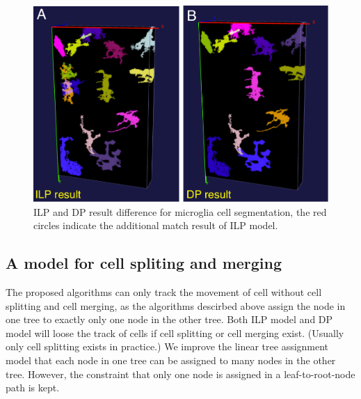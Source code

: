 \begin{figure}[htbp]
\centering
\includegraphics[width=1.0\textwidth]{images/treeassign_threepoint2}
\caption[ILP and DP result difference for microglia cell segmentation]{ILP and DP result difference for microglia cell segmentation, the red circles indicate the additional match result of ILP model.}
\label{fig:treeassign-threepoint2}
\end{figure}

\subsection{A model for cell spliting and merging}
The proposed algorithms can only track the movement of cell without cell splitting and cell merging, as the algorithms descirbed above assign the node in one tree to exactly only one node in the other tree. Both ILP model and DP model will loose the track of cells if cell splitting or cell merging exist. (Usually only cell splitting exists in practice.) We improve the linear tree assignment model that each node in one tree can be assigned to many nodes in the other tree. However, the constraint that only one node is assigned in a leaf-to-root-node path is kept. 

